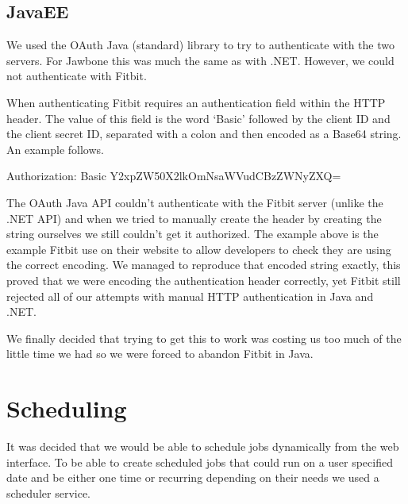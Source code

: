 \subsection{JavaEE}
We used the OAuth Java (standard) library to try to authenticate with the two servers. For Jawbone this was much the same as with .NET. However, we could not authenticate with Fitbit. \par
When authenticating Fitbit requires an authentication field within the HTTP header. The value of this field is the word ‘Basic’ followed by the client ID and the client secret ID, separated with a colon and then encoded as a Base64 string. An example follows. \par
\vspace{2mm}
Authorization: Basic Y2xpZW50X2lkOmNsaWVudCBzZWNyZXQ= \par
\vspace{2mm}
The OAuth Java API couldn’t authenticate with the Fitbit server (unlike the .NET API) and when we tried to manually create the header by creating the string ourselves we still couldn’t get it authorized. The example above is the example Fitbit use on their website to allow developers to check they are using the correct encoding. We managed to reproduce that encoded string exactly, this proved that we were encoding the authentication header correctly, yet Fitbit still rejected all of our attempts with manual HTTP authentication in Java and .NET. \par
We finally decided that trying to get this to work was costing us too much of the little time we had so we were forced to abandon Fitbit in Java.
\section{Scheduling}
It was decided that we would be able to schedule jobs dynamically from the web interface. To be able to create scheduled jobs that could run on a user specified date and be either one time or recurring depending on their needs we used a scheduler service. 
